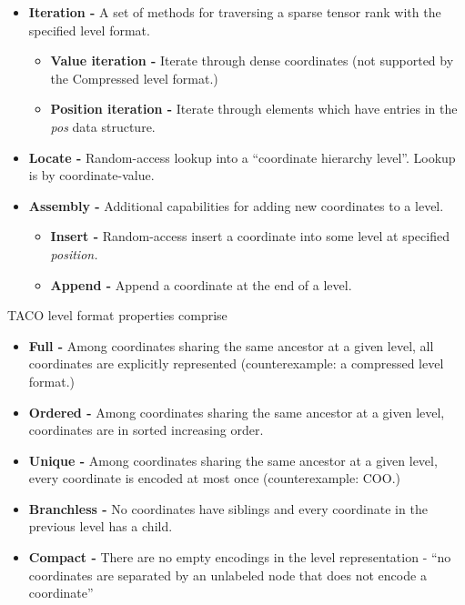 \begin{itemize}
    \item \textbf{Iteration -} A set of methods for traversing a sparse tensor rank with the specified level format.
    \begin{itemize}
        \item \textbf{Value iteration -} Iterate through dense coordinates (not supported by the Compressed level format.)
        \item \textbf{Position iteration -} Iterate through elements which have entries in the \textit{pos} data structure.
    \end{itemize}
    \item \textbf{Locate -} Random-access lookup into a ``coordinate hierarchy level''. Lookup is by coordinate-value.
    \item \textbf{Assembly -} Additional capabilities for adding new coordinates to a level.
    \begin{itemize}
        \item \textbf{Insert -} Random-access insert a coordinate into some level at specified \textit{position.}
        \item \textbf{Append -} Append a coordinate at the end of a level.
    \end{itemize}
\end{itemize}

TACO level format properties comprise

\begin{itemize}
    \item \textbf{Full -} Among coordinates sharing the same ancestor at a given level, all coordinates are explicitly represented (counterexample: a compressed level format.)
    \item \textbf{Ordered -} Among coordinates sharing the same ancestor at a given level, coordinates are in sorted increasing order.
    \item \textbf{Unique -} Among coordinates sharing the same ancestor at a given level, every coordinate is encoded at most once (counterexample: COO.)
    \item \textbf{Branchless -} No coordinates have siblings and every coordinate in the previous level has a child.
    \item \textbf{Compact -} There are no empty encodings in the level representation - ``no coordinates are separated by an unlabeled node that does not encode a coordinate''\cite{taco_format}
\end{itemize}

